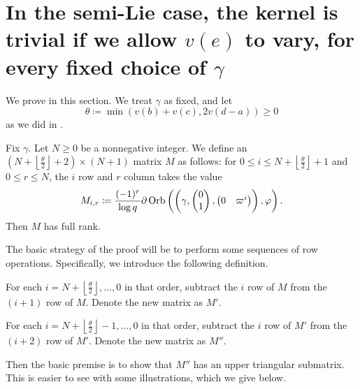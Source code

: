 \section{In the semi-Lie case, the kernel is trivial if we allow $v(e)$ to vary, for every fixed choice of $\gamma$}
We prove  in this section.
We treat $\gamma$ as fixed, and let
\[ \theta \coloneqq \min\left( v(b)+v(c), 2v(d-a) \right) \ge 0 \]
as we did in .

\begin{lemma}
  \label{lem:semi_lie_ker_full_rank}
  Fix $\gamma$. Let $N \ge 0$ be a nonnegative integer.
  We define an $(N+ \left\lfloor \frac{\theta}{2} \right\rfloor + 2) \times (N+1)$ matrix $M$ as follows:
  for $0 \le i \le N+ \left\lfloor \frac{\theta}{2} \right\rfloor + 1$ and $0 \le r \le N$,
  the $i$ row and $r$ column takes the value
  \[
    M_{i,r} \coloneqq \frac{(-1)^r}{\log q} \partial \operatorname{Orb}\left(
      \left(\gamma, \begin{pmatrix} 0 \\ 1 \end{pmatrix},
      \begin{pmatrix} 0 & \varpi^i \end{pmatrix} \right),
      \varphi\right).
  \]
  Then $M$ has full rank.
\end{lemma}
The basic strategy of the proof will be to perform some sequences of row operations.
Specifically, we introduce the following definition.
\begin{itemize}
  \ii For each $i = N + \left\lfloor \frac{\theta}{2} \right\rfloor,\dots,0$ in that order,
  subtract the $i$ row of $M$
  from the $(i+1)$ row of $M$.
  Denote the new matrix as $M'$.

  \ii For each $i = N + \left\lfloor \frac{\theta}{2} \right\rfloor - 1,\dots,0$ in that order,
  subtract the $i$ row of $M'$
  from the $(i+2)$ row of $M'$.
  Denote the new matrix as $M''$.
\end{itemize}
Then the basic premise is to show that $M''$ has an upper triangular submatrix.
This is easier to see with some illustrations, which we give below.

